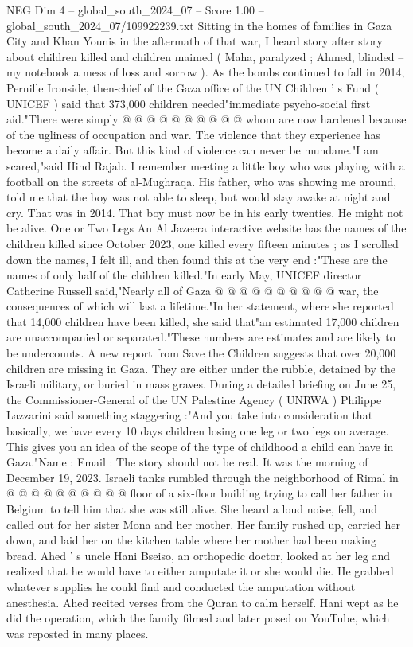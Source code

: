 \begin{textsample}{NEG Dim 4 – global\_south\_2024\_07 – Score 1.00 – global\_south\_2024\_07/109922239.txt}
Sitting in the homes of families in Gaza City and Khan Younis in the aftermath of that war, I heard story after story about children killed and children maimed ( Maha, paralyzed ; Ahmed, blinded -- my notebook a mess of loss and sorrow ).
As the bombs continued to fall in 2014, Pernille Ironside, then-chief of the Gaza office of the UN Children ' s Fund ( UNICEF ) said that 373,000 children needed"immediate psycho-social first aid."There were simply @ @ @ @ @ @ @ @ @ @ whom are now hardened because of the ugliness of occupation and war.
The violence that they experience has become a daily affair.
But this kind of violence can never be mundane."I am scared,"said Hind Rajab.
I remember meeting a little boy who was playing with a football on the streets of al-Mughraqa.
His father, who was showing me around, told me that the boy was not able to sleep, but would stay awake at night and cry.
That was in 2014.
That boy must now be in his early twenties.
He might not be alive.
One or Two Legs An Al Jazeera interactive website has the names of the children killed since October 2023, one killed every fifteen minutes ; as I scrolled down the names, I felt ill, and then found this at the very end :"These are the names of only half of the children killed."In early May, UNICEF director Catherine Russell said,"Nearly all of Gaza @ @ @ @ @ @ @ @ @ @ war, the consequences of which will last a lifetime."In her statement, where she reported that 14,000 children have been killed, she said that"an estimated 17,000 children are unaccompanied or separated."These numbers are estimates and are likely to be undercounts.
A new report from Save the Children suggests that over 20,000 children are missing in Gaza.
They are either under the rubble, detained by the Israeli military, or buried in mass graves.
During a detailed briefing on June 25, the Commissioner-General of the UN Palestine Agency ( UNRWA ) Philippe Lazzarini said something staggering :"And you take into consideration that basically, we have every 10 days children losing one leg or two legs on average.
This gives you an idea of the scope of the type of childhood a child can have in Gaza."Name : Email : The story should not be real.
It was the morning of December 19, 2023.
Israeli tanks rumbled through the neighborhood of Rimal in @ @ @ @ @ @ @ @ @ @ floor of a six-floor building trying to call her father in Belgium to tell him that she was still alive.
She heard a loud noise, fell, and called out for her sister Mona and her mother.
Her family rushed up, carried her down, and laid her on the kitchen table where her mother had been making bread.
Ahed ' s uncle Hani Bseiso, an orthopedic doctor, looked at her leg and realized that he would have to either amputate it or she would die.
He grabbed whatever supplies he could find and conducted the amputation without anesthesia.
Ahed recited verses from the Quran to calm herself.
Hani wept as he did the operation, which the family filmed and later posed on YouTube, which was reposted in many places.

\end{textsample}
